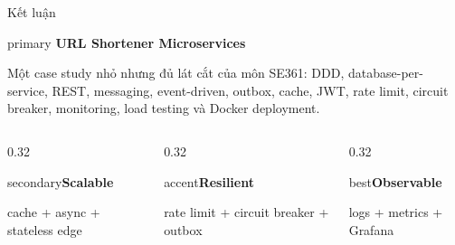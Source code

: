 \documentclass[aspectratio=169]{beamer}
\begin{document}
\begin{frame}{Kết luận}
    \begin{center}
        \begin{claimbox}[width=0.84\textwidth, halign=center]{primary}
            \large \textbf{URL Shortener Microservices}\par
            \vspace{0.25cm}
            \small Một case study nhỏ nhưng đủ lát cắt của môn SE361: DDD, database-per-service, REST, messaging, event-driven, outbox, cache, JWT, rate limit, circuit breaker, monitoring, load testing và Docker deployment.
        \end{claimbox}
    \end{center}
    \vspace{0.35cm}
    \begin{columns}[T,onlytextwidth]
        \begin{column}{0.32\textwidth}\begin{claimbox}{secondary}\centering\textbf{Scalable}\par\small cache + async + stateless edge\end{claimbox}\end{column}
        \begin{column}{0.32\textwidth}\begin{claimbox}{accent}\centering\textbf{Resilient}\par\small rate limit + circuit breaker + outbox\end{claimbox}\end{column}
        \begin{column}{0.32\textwidth}\begin{claimbox}{best}\centering\textbf{Observable}\par\small logs + metrics + Grafana\end{claimbox}\end{column}
    \end{columns}
\end{frame}
\end{document}
